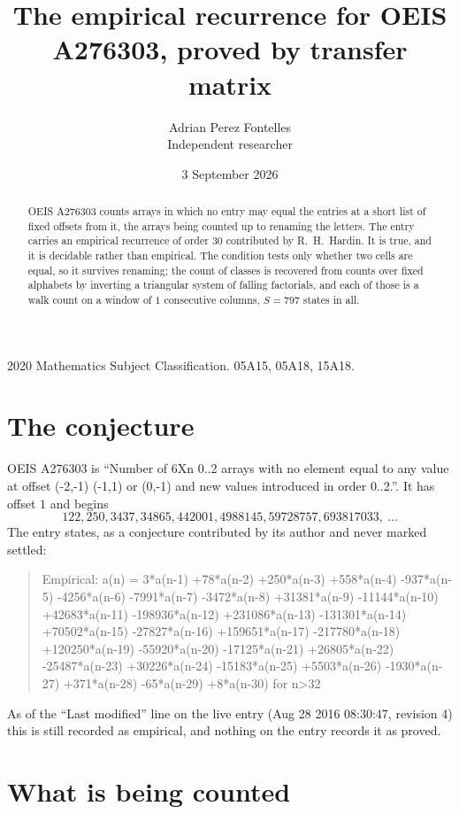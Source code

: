 \documentclass[11pt,a4paper]{article}
\title{The empirical recurrence for OEIS A276303, proved by transfer matrix}
\author{Adrian Perez Fontelles\\ \small Independent researcher}
\date{3 September 2026}
\theoremstyle{plain}
\theoremstyle{definition}
\begin{document}
\maketitle

\begin{abstract}
OEIS A276303 counts arrays in which no entry may equal the entries at a short list of fixed offsets
from it, the arrays being counted up to renaming the letters. The entry carries an empirical
recurrence of order $30$ contributed by R.~H.~Hardin. It is true, and it is decidable
rather than empirical. The condition tests only whether two cells are equal, so it survives
renaming; the count of classes is recovered from counts over fixed alphabets by inverting a
triangular system of falling factorials, and each of those is a walk count on a window of
$1$ consecutive columns, $S=797$ states in all.
\end{abstract}

\noindent\small 2020 Mathematics Subject Classification. 05A15, 05A18, 15A18.\normalsize

\section{The conjecture}

OEIS A276303 is ``Number of 6Xn 0..2 arrays with no element equal to any value at offset (-2,-1) (-1,1) or (0,-1) and new values introduced in order 0..2.''. It has offset $1$ and begins
\[
122, 250, 3437, 34865, 442001, 4988145, 59728757, 693817033,\ \dots
\]
The entry states, as a conjecture contributed by its author and never marked settled:
\begin{quote}
Empirical: a(n) = 3*a(n-1) +78*a(n-2) +250*a(n-3) +558*a(n-4) -937*a(n-5) -4256*a(n-6) -7991*a(n-7) -3472*a(n-8) +31381*a(n-9) -11144*a(n-10) +42683*a(n-11) -198936*a(n-12) +231086*a(n-13) -131301*a(n-14) +70502*a(n-15) -27827*a(n-16) +159651*a(n-17) -217780*a(n-18) +120250*a(n-19) -55920*a(n-20) -17125*a(n-21) +26805*a(n-22) -25487*a(n-23) +30226*a(n-24) -15183*a(n-25) +5503*a(n-26) -1930*a(n-27) +371*a(n-28) -65*a(n-29) +8*a(n-30) for n>32
\end{quote}
As of the ``Last modified'' line on the live entry (Aug 28 2016 08:30:47, revision 4) this is still
recorded as empirical, and nothing on the entry records it as proved.

\section{What is being counted}
\end{document}
